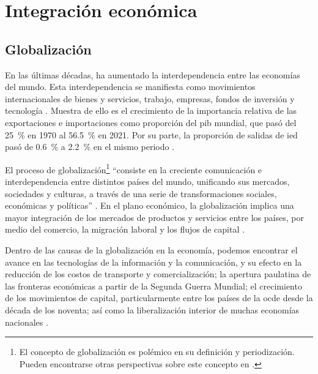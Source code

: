 \chapter{Integración económica}

\section{Globalización}

En las últimas décadas, ha aumentado la interdependencia entre las economías del mundo. Esta interdependencia se manifiesta como movimientos internacionales de bienes y servicios, trabajo, empresas, fondos de inversión y tecnología \parencite[p.~1]{Carbaugh2009}. Muestra de ello es el crecimiento de la importancia relativa de las exportaciones e importaciones como proporción del \gls{pib} mundial, que pasó del 25~\% en 1970 al 56.5~\% en 2021. Por su parte, la proporción de salidas de \gls{ied} pasó de 0.6~\% a 2.2~\% en el mismo periodo \parencite{BancoMundial}.

El proceso de globalización\footnote{El concepto de globalización es polémico en su definición y periodización. Pueden encontrarse otras perspectivas sobre este concepto en \textcite{Ianni2004, Estay2016}.} ``consiste en la creciente comunicación e interdependencia entre distintos países del mundo, unificando sus mercados, sociedades y culturas, a través de una serie de transformaciones sociales, económicas y políticas'' \parencite[p.~222]{Perez2012}. En el plano económico, la globalización implica una mayor integración de los mercados de productos y servicios entre los países, por medio del comercio, la migración laboral y los flujos de capital \parencite[p.~2]{Carbaugh2009}.

Dentro de las causas de la globalización en la economía, podemos encontrar el avance en las tecnologías de la información y la comunicación, y su efecto en la reducción de los costos de transporte y comercialización; la apertura paulatina de las fronteras económicas a partir de la Segunda Guerra Mundial; el crecimiento de los movimientos de capital, particularmente entre los países de la \gls{ocde} desde la década de los noventa; así como la liberalización interior de muchas economías nacionales \parencite[pp.~343--345]{Requijo2011}.

